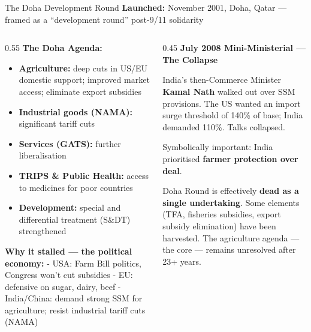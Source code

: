 \documentclass[
  ignorenonframetext,
  aspectratio=169,
]{beamer}
\makeatletter
\providecommand{\tightlist}{%
  \setlength{\itemsep}{0pt}\setlength{\parskip}{0pt}}
\let\quarto@originallabel\label
\DeclareRobustCommand*{\label}[1]{\quarto@originallabel{#1}}
\makeatother
\begin{document}
\begin{frame}{The Doha Development Round}
\label{the-doha-development-round}
\textbf{Launched:} November 2001, Doha, Qatar --- framed as a
``development round'' post-9/11 solidarity

\begin{columns}[T]
\begin{column}{0.55\linewidth}
\textbf{The Doha Agenda:}

\begin{itemize}
\tightlist
\item
  \textbf{Agriculture:} deep cuts in US/EU domestic support; improved
  market access; eliminate export subsidies
\item
  \textbf{Industrial goods (NAMA):} significant tariff cuts
\item
  \textbf{Services (GATS):} further liberalisation
\item
  \textbf{TRIPS \& Public Health:} access to medicines for poor
  countries
\item
  \textbf{Development:} special and differential treatment (S\&DT)
  strengthened
\end{itemize}

\textbf{Why it stalled --- the political economy:} - USA: Farm Bill
politics, Congress won't cut subsidies - EU: defensive on sugar, dairy,
beef - India/China: demand strong SSM for agriculture; resist industrial
tariff cuts (NAMA)
\end{column}

\begin{column}{0.45\linewidth}
\textbf{July 2008 Mini-Ministerial --- The Collapse}

India's then-Commerce Minister \textbf{Kamal Nath} walked out over SSM
provisions. The US wanted an import surge threshold of 140\% of base;
India demanded 110\%. Talks collapsed.

Symbolically important: India prioritised \textbf{farmer protection over
deal}.

Doha Round is effectively \textbf{dead as a single undertaking}. Some
elements (TFA, fisheries subsidies, export subsidy elimination) have
been harvested. The agriculture agenda --- the core --- remains
unresolved after 23+ years.
\end{column}
\end{columns}
\end{frame}
\end{document}
